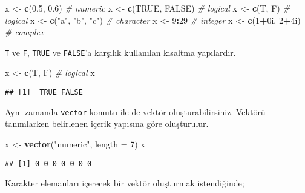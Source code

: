 \documentclass[
]{book}
\newenvironment{Shaded}{\begin{snugshade}}{\end{snugshade}}
\newcommand{\CommentTok}[1]{\textcolor[rgb]{0.56,0.35,0.01}{\textit{#1}}}
\newcommand{\DataTypeTok}[1]{\textcolor[rgb]{0.13,0.29,0.53}{#1}}
\newcommand{\DecValTok}[1]{\textcolor[rgb]{0.00,0.00,0.81}{#1}}
\newcommand{\FloatTok}[1]{\textcolor[rgb]{0.00,0.00,0.81}{#1}}
\newcommand{\KeywordTok}[1]{\textcolor[rgb]{0.13,0.29,0.53}{\textbf{#1}}}
\newcommand{\NormalTok}[1]{#1}
\newcommand{\OperatorTok}[1]{\textcolor[rgb]{0.81,0.36,0.00}{\textbf{#1}}}
\newcommand{\OtherTok}[1]{\textcolor[rgb]{0.56,0.35,0.01}{#1}}
\newcommand{\StringTok}[1]{\textcolor[rgb]{0.31,0.60,0.02}{#1}}
\begin{document}
\begin{Shaded}
\begin{Highlighting}[]
\NormalTok{x <-}\StringTok{ }\KeywordTok{c}\NormalTok{(}\FloatTok{0.5}\NormalTok{, }\FloatTok{0.6}\NormalTok{) }\CommentTok{# numeric }
\NormalTok{x <-}\StringTok{ }\KeywordTok{c}\NormalTok{(}\OtherTok{TRUE}\NormalTok{, }\OtherTok{FALSE}\NormalTok{) }\CommentTok{# logical}
\NormalTok{x <-}\StringTok{ }\KeywordTok{c}\NormalTok{(T, F) }\CommentTok{# logical}
\NormalTok{x <-}\StringTok{ }\KeywordTok{c}\NormalTok{(}\StringTok{"a"}\NormalTok{, }\StringTok{"b"}\NormalTok{, }\StringTok{"c"}\NormalTok{) }\CommentTok{# character}
\NormalTok{x <-}\StringTok{ }\DecValTok{9}\OperatorTok{:}\DecValTok{29} \CommentTok{# integer}
\NormalTok{x <-}\StringTok{ }\KeywordTok{c}\NormalTok{(}\DecValTok{1}\OperatorTok{+}\NormalTok{0i, }\DecValTok{2}\OperatorTok{+}\NormalTok{4i) }\CommentTok{# complex}
\end{Highlighting}
\end{Shaded}

\texttt{T} ve \texttt{F}, \texttt{TRUE} ve \texttt{FALSE}'a karşılık kullanılan kısaltma yapılardır.

\begin{Shaded}
\begin{Highlighting}[]
\NormalTok{x <-}\StringTok{ }\KeywordTok{c}\NormalTok{(T, F) }\CommentTok{# logical}
\NormalTok{x}
\end{Highlighting}
\end{Shaded}

\begin{verbatim}
## [1]  TRUE FALSE
\end{verbatim}

Aynı zamanda \texttt{vector} komutu ile de vektör oluşturabilirsiniz. Vektörü tanımlarken belirlenen içerik yapısına göre oluşturulur.

\begin{Shaded}
\begin{Highlighting}[]
\NormalTok{x <-}\StringTok{ }\KeywordTok{vector}\NormalTok{(}\StringTok{"numeric"}\NormalTok{, }\DataTypeTok{length =} \DecValTok{7}\NormalTok{)}
\NormalTok{x}
\end{Highlighting}
\end{Shaded}

\begin{verbatim}
## [1] 0 0 0 0 0 0 0
\end{verbatim}

Karakter elemanları içerecek bir vektör oluşturmak istendiğinde;
\end{document}
